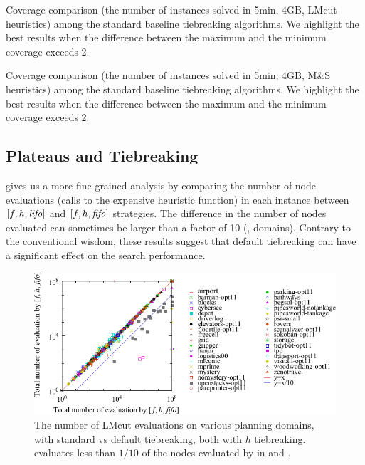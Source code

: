 \begin{table}[htbp]
 {
 \centering
 
 \caption{
 Coverage comparison (the number of instances solved in 5min, 4GB, LMcut
 heuristics) among
 the standard baseline tiebreaking algorithms. We highlight the
 best results when the difference between the maximum and the minimum coverage exceeds 2.
 }
 \label{tbl:lmcut-ipc-std}
 }
\end{table}

\begin{table}[htbp]
 {
 \centering
 
 \caption{
 Coverage comparison (the number of instances solved in 5min, 4GB, M\&S heuristics) among
 the standard baseline tiebreaking algorithms. We highlight the
 best results when the difference between the maximum and the minimum coverage exceeds 2.
 }
 \label{tbl:mands-ipc-std}
 }
\end{table}


\subsection{Plateaus and Tiebreaking}

 gives us a
more fine-grained analysis by comparing the number of node evaluations
(calls to the expensive \lmcut heuristic function) in each instance between $[f,h,{\text{\textit{lifo}}}]$ and $[f,h,{\text{\textit{fifo}}}]$ strategies.
The difference in the number of nodes
evaluated can sometimes be larger than a factor of 10 (,  domains).
Contrary to the conventional wisdom, 
these results suggest that default tiebreaking can have a significant effect on
the search performance.

\begin{figure}[htbp]
 \centering {}
 \includegraphics{tables/aaai16-30min-5min-cut/aaai16prelim3/evaluated-lmcut_ff-lmcut_lf.pdf}
 \caption{The number of LMcut evaluations on various planning domains,
 with standard \fifo vs \lifo default tiebreaking, both with $h$
 tiebreaking. \lifo evaluates  less than $1/10$ of the nodes evaluated
 by \fifo in  and . 
 }
 \label{fig:f-h-eval}
\end{figure}

